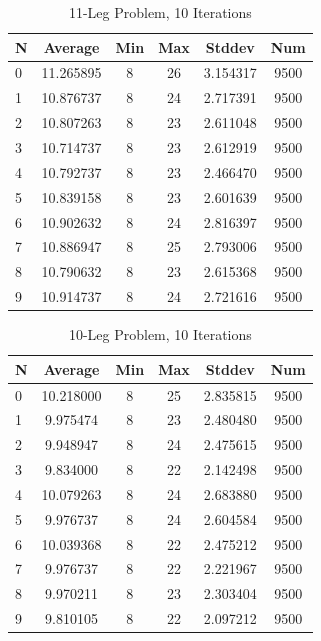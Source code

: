 \documentclass{article}
\begin{document}
\begin{table}
\centering
\begin{tabular}{|l|c|c|c|c|c|}
\hline
N & Average & Min & Max & Stddev & Num \\
\hline
0 & 11.265895 & 8 & 26 & 3.154317 & 9500 \\ 
1 & 10.876737 & 8 & 24 & 2.717391 & 9500 \\ 
2 & 10.807263 & 8 & 23 & 2.611048 & 9500 \\ 
3 & 10.714737 & 8 & 23 & 2.612919 & 9500 \\ 
4 & 10.792737 & 8 & 23 & 2.466470 & 9500 \\ 
5 & 10.839158 & 8 & 23 & 2.601639 & 9500 \\ 
6 & 10.902632 & 8 & 24 & 2.816397 & 9500 \\ 
7 & 10.886947 & 8 & 25 & 2.793006 & 9500 \\ 
8 & 10.790632 & 8 & 23 & 2.615368 & 9500 \\ 
9 & 10.914737 & 8 & 24 & 2.721616 & 9500 \\ 
\hline
\end{tabular}
\caption{11-Leg Problem, 10 Iterations}
\label{tab:template}
\end{table}

\begin{table}
\centering
\begin{tabular}{|l|c|c|c|c|c|}
\hline
N & Average & Min & Max & Stddev & Num \\
\hline
0 & 10.218000 & 8 & 25 & 2.835815 & 9500 \\ 
1 & 9.975474 & 8 & 23 & 2.480480 & 9500 \\ 
2 & 9.948947 & 8 & 24 & 2.475615 & 9500 \\ 
3 & 9.834000 & 8 & 22 & 2.142498 & 9500 \\ 
4 & 10.079263 & 8 & 24 & 2.683880 & 9500 \\ 
5 & 9.976737 & 8 & 24 & 2.604584 & 9500 \\ 
6 & 10.039368 & 8 & 22 & 2.475212 & 9500 \\ 
7 & 9.976737 & 8 & 22 & 2.221967 & 9500 \\ 
8 & 9.970211 & 8 & 23 & 2.303404 & 9500 \\ 
9 & 9.810105 & 8 & 22 & 2.097212 & 9500 \\ 
\hline
\end{tabular}
\caption{10-Leg Problem, 10 Iterations}
\label{tab:template}
\end{table}
\end{document}
